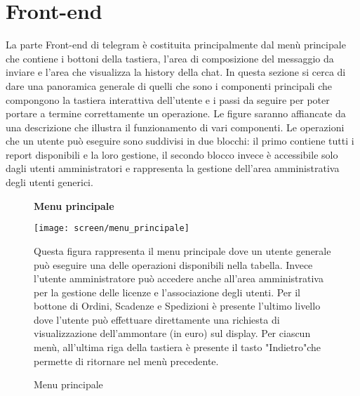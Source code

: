 \section{Front-end}

La parte Front-end di telegram è costituita principalmente dal menù principale che contiene i bottoni della tastiera, l'area di composizione del messaggio da inviare e l'area che visualizza la history della chat. In questa sezione si cerca di dare una panoramica generale di quelli che sono i componenti principali che compongono la tastiera interattiva dell'utente e i passi da seguire per poter portare a termine correttamente un operazione. Le figure saranno affiancate da una descrizione che illustra il funzionamento di vari componenti. 
Le operazioni che un utente può eseguire sono suddivisi in due blocchi: il primo contiene tutti i report disponibili e la loro gestione, il secondo blocco invece è accessibile solo dagli utenti amministratori e rappresenta la gestione dell'area amministrativa degli utenti generici. \\


\begin{figure}[h!]
\begin{center} \textbf{Menu principale} \end{center}
\begin{center}
    \texttt{[image: screen/menu\_principale]} 
    \caption{Menu principale}
    \end{center}
Questa figura rappresenta il menu principale dove un utente generale può eseguire una delle operazioni disponibili nella tabella. Invece l'utente amministratore può accedere anche all'area amministrativa per la gestione delle licenze e l'associazione degli utenti. Per il bottone di Ordini, Scadenze e Spedizioni è presente l'ultimo livello dove l'utente può effettuare direttamente una richiesta di visualizzazione dell'ammontare (in euro) sul display. Per ciascun menù, all'ultima riga della tastiera è presente il tasto "Indietro"che permette di ritornare nel menù precedente. 
\end{figure}  




